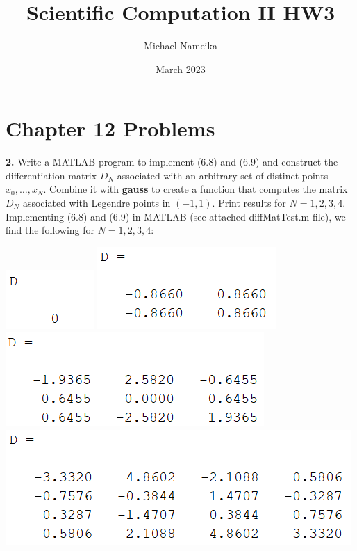 \documentclass{article}
\title{Scientific Computation II HW3}
\author{Michael Nameika}
\date{March 2023}
\begin{document}
\maketitle

\section*{Chapter 12 Problems}
\textbf{2.} Write a MATLAB program to implement (6.8) and (6.9) and construct the differentiation matrix $D_N$ associated with an arbitrary set of distinct points $x_0, \dots, x_N$. Combine it with \textbf{gauss} to create a function that computes the matrix $D_N$ associated with Legendre points in $(-1,1)$. Print results for $N = 1,2,3,4$.
\newline\newline\newline
Implementing (6.8) and (6.9) in MATLAB (see attached diffMatTest.m file), we find the following for $N=1,2,3,4$:
\begin{center}
    \includegraphics{GaussN=1}
    \includegraphics{GaussN=2}
    \newline\newline\newline
    \includegraphics{GaussN=3}
    \includegraphics{GaussN=4}
    \newline\newline\newline
\end{center}
\end{document}
